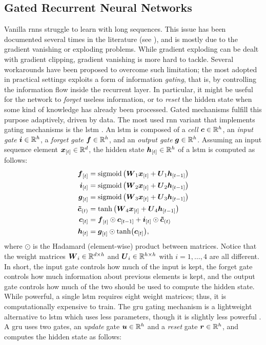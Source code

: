 \subsection{Gated Recurrent Neural Networks}
Vanilla \glspl{rnn} struggle to learn with long sequences. This issue has been documented several times in the literature (see \eg \citep{bengio1994learninglongtermdependenciesdifficult}), and is mostly due to the gradient vanishing or exploding problems. While gradient exploding can be dealt with gradient clipping, gradient vanishing is more hard to tackle. Several workarounds have been proposed to overcome such limitation; the most adopted in practical settings exploits a form of information \emph{gating}, that is, by controlling the information flow inside the recurrent layer. In particular, it might be useful for the network to \emph{forget} useless information, or to \emph{reset} the hidden state when some kind of knowledge has already been processed. Gated mechanisms fulfill this purpose adaptively, driven by data. The most used \gls{rnn} variant that implements gating mechanisms is the \gls{lstm} \citep{hochreiter1997lstm}.
An \gls{lstm} is composed of a \emph{cell} $\Vector{c} \in \Real^h$, an \emph{input gate} $\Vector{i} \in \Real^h$, a \emph{forget gate} $\Vector{f} \in \Real^h$, and an \emph{output gate} $\Vector{g} \in \Real^h$. Assuming an input sequence element $\Elem{x}{t} \in \Real^d$, the hidden state $\Elem{h}{t} \in \Real^h$ of a \gls{lstm} is computed as follows:
\begin{align*}
    \Elem{f}{t} &= \sigmoid\Par{\Matrix{W}_{1}\Elem{x}{t} + \Matrix{U}_{1}\Elem{h}{t-1}}\\
    \Elem{i}{t} &= \sigmoid\Par{\Matrix{W}_{2}\Elem{x}{t} + \Matrix{U}_{2}\Elem{h}{t-1}}\\
    \Elem{g}{t} &= \sigmoid\Par{\Matrix{W}_{3}\Elem{x}{t} + \Matrix{U}_{3}\Elem{h}{t-1}}\\
    \Vector{\tilde{c}}_{(t)} &= \tanh\Par{\Matrix{W}_{4}\Elem{x}{t} + \Matrix{U}_{4}\Elem{h}{t-1}}\\
    \Elem{c}{t} &= \Elem{f}{t} \odot \Elem{c}{t-1} + \Elem{i}{t} \odot \Vector{\tilde{c}}_{(t)}\\
    \Elem{h}{t} &= \Elem{g}{t} \odot \tanh(\Elem{c}{t}),
\end{align*}
where $\odot$ is the Hadamard (element-wise) product between matrices. Notice that the weight matrices $\Matrix{W}_i \in \Real^{d \times h}$ and $\Matrix{U}_i \in \Real^{h \times h}$ with $i=1, \ldots, 4$ are all different. In short, the input gate controls how much of the input is kept, the forget gate controls how much information about previous elements is kept, and the output gate controls how much of the two should be used to compute the hidden state. While powerful, a single \gls{lstm} requires eight weight matrices; thus, it is computationally expensive to train. The \gls{gru} \citep{cho2014gru} gating mechanism is a lightweight alternative to \gls{lstm} which uses less parameters, though it is slightly less powerful \citep{gruber2020gruspecificlstm}. A \gls{gru} uses two gates, an \emph{update} gate $\Vector{u} \in \Real^h$ and a \emph{reset} gate $\Vector{r} \in \Real^h$, and computes the hidden state as follows:

